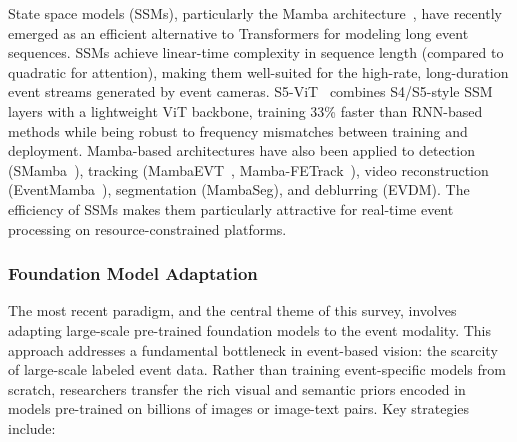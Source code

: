 State space models (SSMs), particularly the Mamba architecture~\cite{gu2023mamba}, have recently emerged as an efficient alternative to Transformers for modeling long event sequences. SSMs achieve linear-time complexity in sequence length (compared to quadratic for attention), making them well-suited for the high-rate, long-duration event streams generated by event cameras. S5-ViT~\cite{zubic2024s5vit} combines S4/S5-style SSM layers with a lightweight ViT backbone, training 33\% faster than RNN-based methods while being robust to frequency mismatches between training and deployment. Mamba-based architectures have also been applied to detection (SMamba~\cite{li2025smamba}), tracking (MambaEVT~\cite{wang2024mambaevt}, Mamba-FETrack~\cite{wang2024mambafe}), video reconstruction (EventMamba~\cite{zhang2025eventmamba}), segmentation (MambaSeg), and deblurring (EVDM). The efficiency of SSMs makes them particularly attractive for real-time event processing on resource-constrained platforms.


\subsubsection{Foundation Model Adaptation}
\label{sec:paradigm_foundation}

The most recent paradigm, and the central theme of this survey, involves adapting large-scale pre-trained foundation models to the event modality. This approach addresses a fundamental bottleneck in event-based vision: the scarcity of large-scale labeled event data. Rather than training event-specific models from scratch, researchers transfer the rich visual and semantic priors encoded in models pre-trained on billions of images or image-text pairs. Key strategies include:


